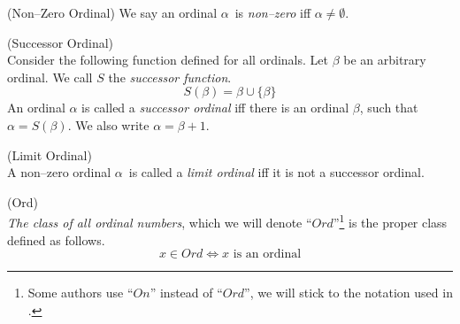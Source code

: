 \begin{definition}{(Non–Zero Ordinal)} %
We say an ordinal $\alpha$ is \emph{non–zero} iff $\alpha \neq \emptyset$.
\end{definition}

\begin{definition}{(Successor Ordinal)}\label{def:successor_ordinal}\\ %
Consider the following function defined for all ordinals. Let $\beta$ be an arbitrary ordinal. We call $S$ the \emph{successor function}.
\begin{equation}
S(\beta) = \beta \cup \{\beta\}
\end{equation}
An ordinal $\alpha$ is called a \emph{successor ordinal} iff there is an ordinal $\beta$, such that $\alpha = S(\beta)$. We also write $\alpha = \beta+1$.
\end{definition}

\begin{definition}{(Limit Ordinal)}\label{def:limit_ordinal}\\ %
A non–zero ordinal $\alpha$ is called a \emph{limit ordinal} iff it is not a successor ordinal.
\end{definition}

\begin{definition}{(Ord)}\label{def:ord}\\  %
\emph{The class of all ordinal numbers}, which we will denote ``$Ord$''\footnote{Some authors use ``$On$'' instead of ``$Ord$'', we will stick to the notation used in \cite{JechBook}.} is the proper class defined as follows.
\begin{equation}
x \in Ord \iff x\mbox{ is an ordinal}
\end{equation}
\end{definition}



